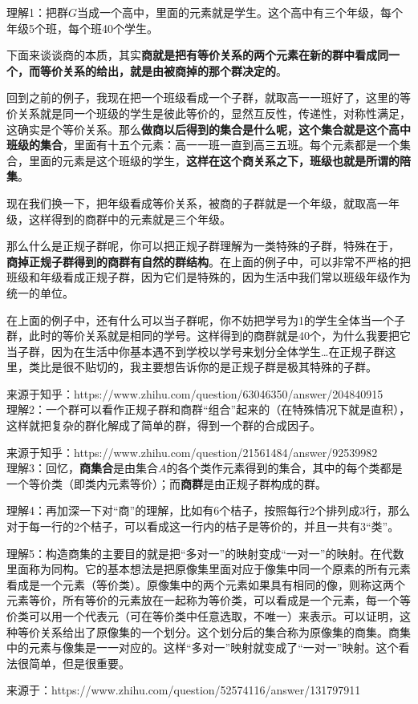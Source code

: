 \documentclass[12pt]{article}
\begin{document}
\begin{framed}
\small {
理解1：把群$G$当成一个高中，里面的元素就是学生。这个高中有三个年级，每个年级5个班，每个班40个学生。

下面来谈谈商的本质，其实\textbf{商就是把有等价关系的两个元素在新的群中看成同一个，而等价关系的给出，就是由被商掉的那个群决定的}。

回到之前的例子，我现在把一个班级看成一个子群，就取高一一班好了，这里的等价关系就是同一个班级的学生是彼此等价的，显然互反性，传递性，对称性满足，这确实是个等价关系。那么\textbf{做商以后得到的集合是什么呢，这个集合就是这个高中班级的集合}，里面有十五个元素：高一一班一直到高三五班。每个元素都是一个集合，里面的元素是这个班级的学生，\textbf{这样在这个商关系之下，班级也就是所谓的陪集}。

现在我们换一下，把年级看成等价关系，被商的子群就是一个年级，就取高一年级，这样得到的商群中的元素就是三个年级。

那么什么是正规子群呢，你可以把正规子群理解为一类特殊的子群，特殊在于，
\textbf{商掉正规子群得到的商群有自然的群结构}。在上面的例子中，可以非常不严格的把班级和年级看成正规子群，因为它们是特殊的，因为生活中我们常以班级年级作为统一的单位。

在上面的例子中，还有什么可以当子群呢，你不妨把学号为1的学生全体当一个子群，此时的等价关系就是相同的学号。这样得到的商群就是40个，为什么我要把它当子群，因为在生活中你基本遇不到学校以学号来划分全体学生…在正规子群这里，类比是很不贴切的，我主要想告诉你的是正规子群是极其特殊的子群。

来源于知乎：https://www.zhihu.com/question/63046350/answer/204840915
~\\

理解2：一个群可以看作正规子群和商群“组合”起来的（在特殊情况下就是直积），这样就把复杂的群化解成了简单的群，得到一个群的合成因子。

来源于知乎：https://www.zhihu.com/question/21561484/answer/92539982
~\\

理解3：回忆，\textbf{商集合}是由集合$A$的各个类作元素得到的集合，其中的每个类都是一个等价类（即类内元素等价）；而\textbf{商群}是由正规子群构成的群。

理解4：再加深一下对“商”的理解，比如有6个桔子，按照每行2个排列成3行，那么对于每一行的2个桔子，可以看成这一行内的桔子是等价的，并且一共有3“类”。

理解5：构造商集的主要目的就是把“多对一”的映射变成“一对一”的映射。在代数里面称为同构。它的基本想法是把原像集里面对应于像集中同一个原素的所有元素看成是一个元素（等价类）。原像集中的两个元素如果具有相同的像，则称这两个元素等价，所有等价的元素放在一起称为等价类，可以看成是一个元素，每一个等价类可以用一个代表元（可在等价类中任意选取，不唯一）来表示。可以证明，这种等价关系给出了原像集的一个划分。这个划分后的集合称为原像集的商集。商集中的元素与像集是一一对应的。这样“多对一”映射就变成了“一对一”映射。这个看法很简单，但是很重要。

来源于：https://www.zhihu.com/question/52574116/answer/131797911
}
\end{framed}
\end{document}
